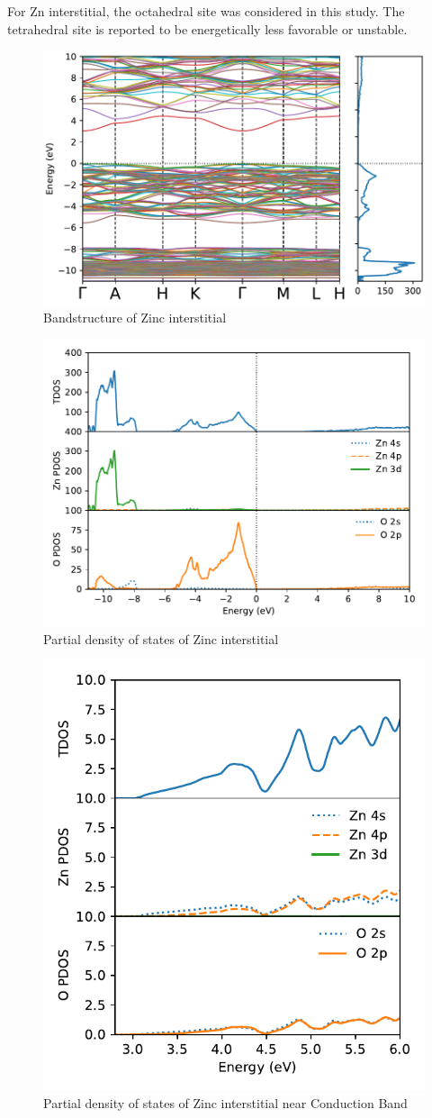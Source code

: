
For Zn interstitial, the octahedral site was considered in this study. The tetrahedral site is reported to be energetically less favorable or unstable. 

\begin{figure}[tbh!]
	\centering
	\includegraphics[width=0.7\linewidth]{"images/rnd/band-dos_Zn_i"}
	\caption[Bandstructure of Zinc interstitial]{Bandstructure of Zinc interstitial}
\end{figure}

\begin{figure}[tbh!]
	\centering
	\includegraphics[width=0.7\linewidth]{"images/rnd/dos-pdos_Zn_i"}
	\caption[Partial density of states of Zinc interstitial]{Partial density of states of Zinc interstitial}
\end{figure}

\begin{figure}[tbh!]
	\centering
	\includegraphics[width=0.5\linewidth]{"images/rnd/dos-pdos-zoom_Zn_i"}
	\caption[Partial density of states of Zinc interstitial near Conduction Band]{Partial density of states of Zinc interstitial near Conduction Band}
\end{figure}

